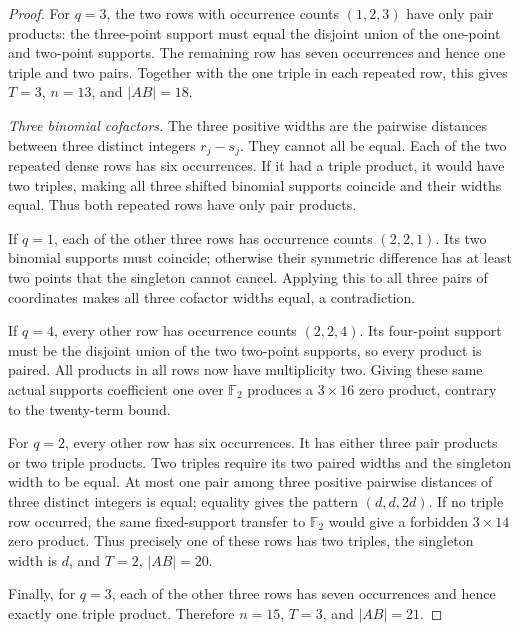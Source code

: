 \documentclass[11pt,a4paper,oneside]{report}
\theoremstyle{definition}
\theoremstyle{remark}
\begin{document}
\begin{proof}
For $q=3$, the two rows with occurrence counts $(1,2,3)$ have only
pair products: the three-point support must equal the disjoint
union of the one-point and two-point supports. The remaining row
has seven occurrences and hence one triple and two pairs.
Together with the one triple in each repeated row, this gives
$T=3$, $n=13$, and $|AB|=18$.

\emph{Three binomial cofactors.}
The three positive widths are the pairwise distances between three
distinct integers $r_j-s_j$. They cannot all be equal. Each of
the two repeated dense rows has six occurrences. If it had a
triple product, it would have two triples, making all three
shifted binomial supports coincide and their widths equal.
Thus both repeated rows have only pair products.

If $q=1$, each of the other three rows has occurrence counts
$(2,2,1)$. Its two binomial supports must coincide; otherwise their
symmetric difference has at least two points that the singleton
cannot cancel. Applying this to all three pairs of coordinates
makes all three cofactor widths equal, a contradiction.

If $q=4$, every other row has occurrence counts $(2,2,4)$.
Its four-point support must be the disjoint union of the two
two-point supports, so every product is paired. All products in
all rows now have multiplicity two. Giving these same actual
supports coefficient one over $\mathbb F_2$ produces a
$3\times16$ zero product, contrary to the twenty-term bound.

For $q=2$, every other row has six occurrences. It has either
three pair products or two triple products. Two triples require
its two paired widths and the singleton width to be equal.
At most one pair among three positive pairwise distances of
three distinct integers is equal; equality gives the pattern
$(d,d,2d)$. If no triple row occurred, the same fixed-support
transfer to $\mathbb F_2$ would give a forbidden $3\times14$
zero product. Thus precisely one of these rows has two triples,
the singleton width is $d$, and $T=2$, $|AB|=20$.

Finally, for $q=3$, each of the other three rows has seven
occurrences and hence exactly one triple product. Therefore
$n=15$, $T=3$, and $|AB|=21$.
\end{proof}
\end{document}
